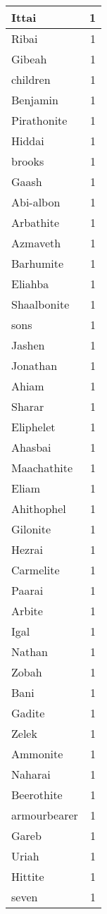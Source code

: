 \begin{center}
\begin{longtable}{l|r}
Ittai & 1 \\ \hline
Ribai & 1 \\ \hline
Gibeah & 1 \\ \hline
children & 1 \\ \hline
Benjamin & 1 \\ \hline
Pirathonite & 1 \\ \hline
Hiddai & 1 \\ \hline
brooks & 1 \\ \hline
Gaash & 1 \\ \hline
Abi-albon & 1 \\ \hline
Arbathite & 1 \\ \hline
Azmaveth & 1 \\ \hline
Barhumite & 1 \\ \hline
Eliahba & 1 \\ \hline
Shaalbonite & 1 \\ \hline
sons & 1 \\ \hline
Jashen & 1 \\ \hline
Jonathan & 1 \\ \hline
Ahiam & 1 \\ \hline
Sharar & 1 \\ \hline
Eliphelet & 1 \\ \hline
Ahasbai & 1 \\ \hline
Maachathite & 1 \\ \hline
Eliam & 1 \\ \hline
Ahithophel & 1 \\ \hline
Gilonite & 1 \\ \hline
Hezrai & 1 \\ \hline
Carmelite & 1 \\ \hline
Paarai & 1 \\ \hline
Arbite & 1 \\ \hline
Igal & 1 \\ \hline
Nathan & 1 \\ \hline
Zobah & 1 \\ \hline
Bani & 1 \\ \hline
Gadite & 1 \\ \hline
Zelek & 1 \\ \hline
Ammonite & 1 \\ \hline
Naharai & 1 \\ \hline
Beerothite & 1 \\ \hline
armourbearer & 1 \\ \hline
Gareb & 1 \\ \hline
Uriah & 1 \\ \hline
Hittite & 1 \\ \hline
seven & 1 \\ \hline
\end{longtable}
\end{center}



